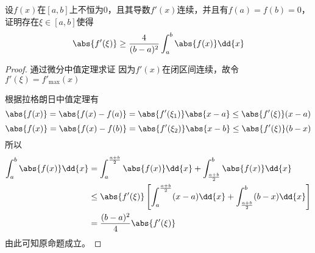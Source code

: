 \begin{example}
    设$f(x)$在$[a,b]$上不恒为$0$，且其导数$f'(x)$连续，并且有$f(a)=f(b)=0$，证明存在$\xi\in[a,b]$使得
    \[ \abs{f'(\xi)} \geq \frac{4}{(b-a)^2} \int_a^b\abs{f(x)}\dd{x} \]
\end{example}
\begin{proof}
    通过微分中值定理求证
    因为$f'(x)$在闭区间连续，故令$f'(\xi) = f'_{\max}(x)$

    根据拉格朗日中值定理有
    \[ \abs{f(x)} = \abs{f(x)-f(a)} = \abs{f'(\xi_1)}\abs{x-a} \leq \abs{f'(\xi)}(x-a) \]
    \[ \abs{f(x)} = \abs{f(x)-f(b)} = \abs{f'(\xi_2)}\abs{x-b} \leq \abs{f'(\xi)}(b-x) \]
    所以
    \begin{align*}
        \int_a^b\abs{f(x)}\dd{x} & = \int_a^{\frac{a+b}{2}} \abs{f(x)}\dd{x} + \int_{\frac{a+b}{2}}^b \abs{f(x)}\dd{x}                      \\
                           & \leq \abs{f'(\xi)}\left[ \int_a^{\frac{a+b}{2}} (x-a)\dd{x} + \int_{\frac{a+b}{2}}^b (b-x)\dd{x} \right] \\
                           & = \frac{(b-a)^2}{4}\abs{f'(\xi)}
    \end{align*}
    由此可知原命题成立。
\end{proof}

